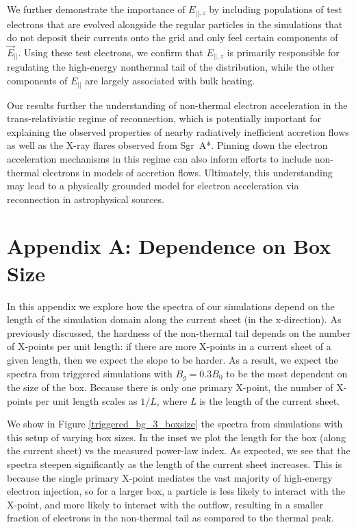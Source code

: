 We further demonstrate the importance of $E_{||,z}$ by including populations of test electrons that are evolved alongside the regular particles in the simulations that do not deposit their currents onto the grid and only feel certain components of $\vec{E}_{||}$.  Using these test electrons, we confirm that $E_{||,z}$ is primarily responsible for regulating the high-energy nonthermal tail of the distribution, while the other components of $E_{||}$ are largely associated with bulk heating.  

Our results further the understanding of non-thermal electron acceleration in the trans-relativistic regime of reconnection, which is potentially important for explaining the observed properties of nearby radiatively inefficient accretion flows as well as the X-ray flares observed from Sgr~A*.   Pinning down the electron acceleration mechanisms in this regime can also inform efforts to include non-thermal electrons in models of accretion flows.  Ultimately, this understanding may lead to a physically grounded model for electron acceleration via reconnection in astrophysical sources.

\section{Appendix A: Dependence on Box Size}\label{box_size}
In this appendix we explore how the spectra of our simulations depend on the length of the simulation domain along the current sheet (in the x-direction).  As previously discussed, the hardness of the non-thermal tail depends on the number of X-points per unit length: if there are more X-points in a current sheet of a given length, then we expect the slope to be harder.  As a result, we expect the spectra from triggered simulations with $B_{g}=0.3B_{0}$ to be the most dependent on the size of the box.  Because there is only one primary X-point, the number of X-points per unit length scales as $1/L$, where \textit{L} is the length of the current sheet.  

We show in Figure \ref{triggered_bg_3_boxsize} the spectra from simulations with this setup of varying box sizes.  In the inset we plot the length for the box (along the current sheet) vs the measured power-law index.  As expected, we see that the spectra steepen significantly as the length of the current sheet increases.  This is because the single primary X-point mediates the vast majority of high-energy electron injection, so for a larger box, a particle is less likely to interact with the X-point, and more likely to interact with the outflow, resulting in a smaller fraction of electrons in the non-thermal tail as compared to the thermal peak.


